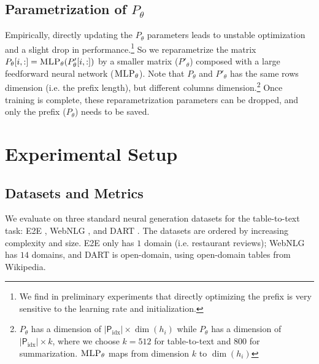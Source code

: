 \documentclass[11pt,a4paper]{article}
\newcommand{\exper}[1]{\textsc{#1}}
\newcommand{\MLP}{\exper{MLP}}
\newcommand{\pp}{\textsf{P$_{\text{idx}}$}}
\newcommand{\PrefixMatrix}{P}
\newcommand\pl[1]{\textcolor{red}{[PL: #1]}}
\begin{document}
\subsection{Parametrization of $\PrefixMatrix_\theta$ }
\label{ssec:parametrization}
Empirically, directly updating the $\PrefixMatrix_\theta$ parameters leads to unstable optimization and a slight drop in performance.\footnote{We find in preliminary experiments that directly optimizing the prefix is very sensitive to the learning rate and initialization.}
So we reparametrize the matrix $\PrefixMatrix_\theta [i,:]= \MLP_\theta (\PrefixMatrix'_\theta[i,:])$ by a smaller matrix ($\PrefixMatrix'_\theta$) composed with a large feedforward neural network ($\MLP_\theta$). 
Note that  $\PrefixMatrix_\theta$ and $\PrefixMatrix'_\theta$ has the same rows dimension (i.e. the prefix length), but different columns dimension.\footnote{$\PrefixMatrix_\theta$  has a dimension of $|\pp| \times \dim(h_i)$ while $\PrefixMatrix_\theta$ has a dimension  of  $|\pp| \times k$, where we choose $k=512$ for table-to-text and $800$ for summarization. $\MLP_\theta$ maps from dimension $k$ to $\dim(h_i)$} 
Once training is complete, these reparametrization parameters can be dropped, and only the prefix ($\PrefixMatrix_\theta$) needs to be saved.  

\section{Experimental Setup}

\subsection{Datasets and Metrics}
\label{ssec:dataset}
We evaluate on three standard neural generation datasets for the table-to-text task: E2E \cite{e2edata}, WebNLG \cite{webnlg-2017}, and DART \cite{radev2020dart}. The datasets are ordered by increasing complexity and size. E2E only has $1$ domain (i.e. restaurant reviews); WebNLG has $14$ domains, and DART is open-domain, using open-domain tables from Wikipedia.
\end{document}
